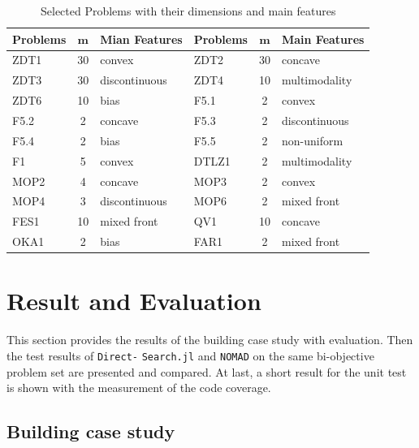 \documentclass[11pt,oneside,onecolumn,openright]{article}
\begin{document}
  \begin{table}[tbp]
    \centering
    \caption{Selected Problems with their dimensions and main features}
      \begin{tabular}{lcl|lcl}
      \toprule
  \textbf{Problems} & $\mathbf{m}$ & \textbf{Mian Features} & \textbf{Problems} & $\mathbf{m}$ & \textbf{Main Features}\\
      \hline    
      ZDT1~\cite{huband2006review} & 30 & convex & ZDT2~\cite{huband2006review} & 30 & concave \\
      ZDT3~\cite{huband2006review} & 30 & discontinuous & ZDT4~\cite{huband2006review} & 10 & multimodality\\
      ZDT6~\cite{huband2006review} & 10 & bias & F5.1~\cite{audet2008multiobjective} & 2 & convex \\
      F5.2~\cite{audet2008multiobjective} & 2 & concave & F5.3~\cite{audet2008multiobjective} & 2 & discontinuous \\
      F5.4~\cite{audet2008multiobjective} & 2 & bias & F5.5~\cite{audet2008multiobjective} & 2 & non-uniform \\  
      F1~\cite{brockhoff2016using} &5 & convex & DTLZ1~\cite{huband2006review} & 2 &  multimodality\\
      MOP2~\cite{huband2006review} & 4 & concave & MOP3~\cite{huband2006review} & 2 & convex \\
      MOP4~\cite{huband2006review} & 3& discontinuous & MOP6~\cite{huband2006review}&2& mixed front \\
      FES1~\cite{huband2006review} & 10 & mixed front & QV1~\cite{huband2006review}& 10 & concave\\
      OKA1~\cite{davidor1994parallel} &2  & bias & FAR1~\cite{huband2006review}& 2 & mixed front \\
      \bottomrule
      \end{tabular}%
    \label{tab:probs}%
  \end{table}%


\section{Result and Evaluation}\label{sec:reseva}
This section provides the results of the building case study with evaluation. Then the test results of \verb|Direct-| \verb|Search.jl| and \verb|NOMAD| on the same bi-objective problem set are presented and compared. At last, a short result for the unit test is shown with the measurement of the code coverage.
\subsection{Building case study}
\end{document}
